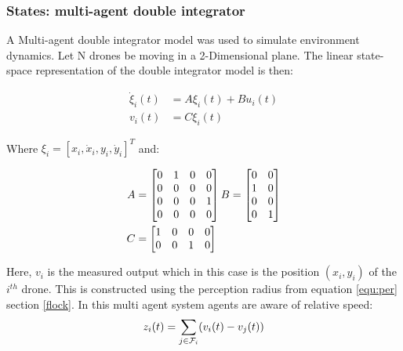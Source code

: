 \subsubsection{States: multi-agent  double integrator}
A Multi-agent double integrator model\cite{mul1}  was used to simulate environment dynamics. Let N drones be moving in a 2-Dimensional plane. The linear state-space representation of the double integrator model is then:

\begin{equation}
\begin{aligned}
\dot{\xi}_{i}(t) &= A\xi_i(t) + Bu_i(t)\\
v_{i}(t) &= C\xi_i(t)
\end{aligned}
\end{equation}

\noindent
Where $\xi_i = [x_i,\dot{x}_i,y_i,\dot{y}_i]^T$ and:

\vspace{0.5cm}


\begin{align*}
 A &= 
    \begin{bmatrix*}[r]
        0 & 1 & 0 & 0\\
        0 & 0 & 0 & 0\\
        0 & 0 & 0 & 1\\
        0 & 0 & 0 & 0
    \end{bmatrix*}
    B = 
    \begin{bmatrix*}
        0 & 0\\
        1 & 0\\
        0 & 0\\
        0 & 1
    \end{bmatrix*}\\
    \centering
    C &= 
     \begin{bmatrix*}
        1 & 0 & 0 & 0\\
        0 & 0 & 1 & 0
    \end{bmatrix*}
\end{align*}

\noindent
Here, $v_i$ is the measured output which in this case is the position $(x_i,y_i)$ of the $i^{th}$ drone. This is constructed using the perception radius from equation \ref{equ:per} section \ref{flock}. In this multi agent system agents are aware of relative speed:
\begin{equation}
z_{i}(t) = \sum_{j\in{\cal{F}}_i}(v_i(t) - v_j(t))
\end{equation}

